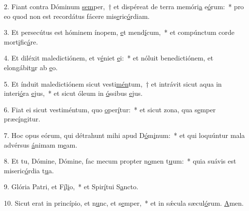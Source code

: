 2. Fiant contra Dóminum \uline{sem}per,~† et dispéreat de terra memóri\uline{a} e\uline{ó}rum:~* pro eo quod non est recordátus fácere mis\uline{e}ric\uline{ó}rdiam.\par 
3. Et persecútus est hóminem ínopem, \uline{e}t mend\uline{í}cum,~* et compúnctum corde mort\uline{i}fic\uline{á}re.\par 
4. Et diléxit maledictiónem, et v\uline{é}niet \uline{e}i:~* et nóluit benedictiónem, et elongábit\uline{u}r ab \uline{e}o.\par 
5. Et índuit maledictiónem sicut vesti\uline{mén}tum,~† et intrávit sicut aqua in interi\uline{ó}ra \uline{e}jus,~* et sicut óleum in \uline{ó}ssibus \uline{e}jus.\par 
6. Fiat ei sicut vestiméntum, quo \uline{o}per\uline{í}tur:~* et sicut zona, qua s\uline{e}mper præc\uline{í}ngitur.\par 
7. Hoc opus eórum, qui détrahunt mihi apud D\uline{ó}m\uline{i}num:~* et qui loquúntur mala advérsus \uline{á}nimam m\uline{e}am.\par 
8. Et tu, Dómine, Dómine, fac mecum propter n\uline{o}men t\uline{u}um:~* quia suávis est miseric\uline{ó}rdia t\uline{u}a.\par 
9. Glória Patri, et F\uline{í}l\uline{i}o,~* et Spir\uline{í}tui S\uline{a}ncto.\par 
10. Sicut erat in princípio, et n\uline{u}nc, et s\uline{e}mper,~* et in sǽcula sæcul\uline{ó}rum. \uline{A}men.\par 
